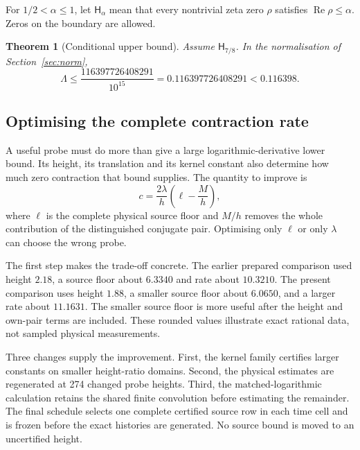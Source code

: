 \documentclass[11pt,a4paper]{article}
\newtheorem{theorem}{Theorem}
\theoremstyle{definition}\newtheorem{definition}[theorem]{Definition}
\theoremstyle{remark}\newtheorem{remark}[theorem]{Remark}
\newcommand{\HH}{\mathsf H}
\newcommand{\Rea}{\operatorname{Re}}
\begin{document}
For $1/2<\alpha\le1$, let $\HH_\alpha$ mean that every nontrivial zeta zero
$\rho$ satisfies $\Rea\rho\le\alpha$. Zeros on the boundary are allowed.
\begin{theorem}[Conditional upper bound]\label{thm:main}
Assume $\HH_{7/8}$. In the normalisation of Section~\ref{sec:norm},
\begin{equation}\label{eq:bound}
\boxed{\Lambda\le\frac{116397726408291}{10^{15}}
=0.116397726408291<0.116398.}
\end{equation}
\end{theorem}

\subsection{Optimising the complete contraction rate}
A useful probe must do more than give a large logarithmic-derivative lower
bound. Its height, its translation and its kernel constant also determine
how much zero contraction that bound supplies. The quantity to improve is
\[
 c=\frac{2\lambda}{h}\left(\ell-\frac Mh\right),
\]
where $\ell$ is the complete physical source floor and $M/h$ removes the
whole contribution of the distinguished conjugate pair. Optimising only
$\ell$ or only $\lambda$ can choose the wrong probe.

The first step makes the trade-off concrete. The earlier prepared
comparison used height $2.18$, a source floor about $6.3340$ and rate about
$10.3210$. The present comparison uses height $1.88$, a smaller source
floor about $6.0650$, and a larger rate about $11.1631$. The smaller source
floor is more useful after the height and own-pair terms are included.
These rounded values illustrate exact rational data, not sampled physical
measurements.

Three changes supply the improvement. First, the kernel family certifies
larger constants on smaller height-ratio domains. Second, the physical
estimates are regenerated at 274 changed probe heights. Third, the
matched-logarithmic calculation retains the shared finite convolution
before estimating the remainder. The final schedule selects one complete
certified source row in each time cell and is frozen before the exact
histories are generated. No source bound is moved to an uncertified height.
\end{document}

